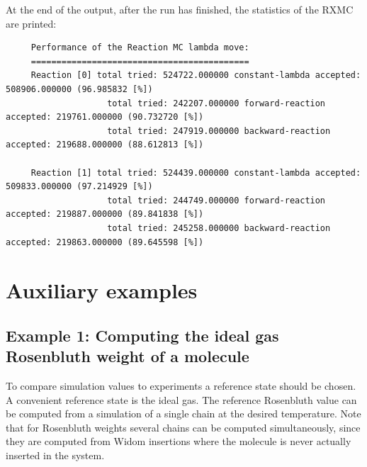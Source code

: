At the end of the output, after the run has finished, the statistics of the RXMC are printed:
\begin{tiny}
\begin{verbatim}
     Performance of the Reaction MC lambda move:
     ===========================================
     Reaction [0] total tried: 524722.000000 constant-lambda accepted: 508906.000000 (96.985832 [%])
                    total tried: 242207.000000 forward-reaction accepted: 219761.000000 (90.732720 [%])
                    total tried: 247919.000000 backward-reaction accepted: 219688.000000 (88.612813 [%])
     
     Reaction [1] total tried: 524439.000000 constant-lambda accepted: 509833.000000 (97.214929 [%])
                    total tried: 244749.000000 forward-reaction accepted: 219887.000000 (89.841838 [%])
                    total tried: 245258.000000 backward-reaction accepted: 219863.000000 (89.645598 [%])
\end{verbatim}
\end{tiny}
\section{Auxiliary examples}

\subsection*{Example 1: Computing the ideal gas Rosenbluth weight of a molecule}

To compare simulation values to experiments a reference state should be chosen. A convenient reference state
is the ideal gas. The reference Rosenbluth value can be computed from a simulation of a single chain at the
desired temperature. Note that for Rosenbluth weights several chains can be computed simultaneously, since
they are computed from Widom insertions where the molecule is never actually inserted in the system.


